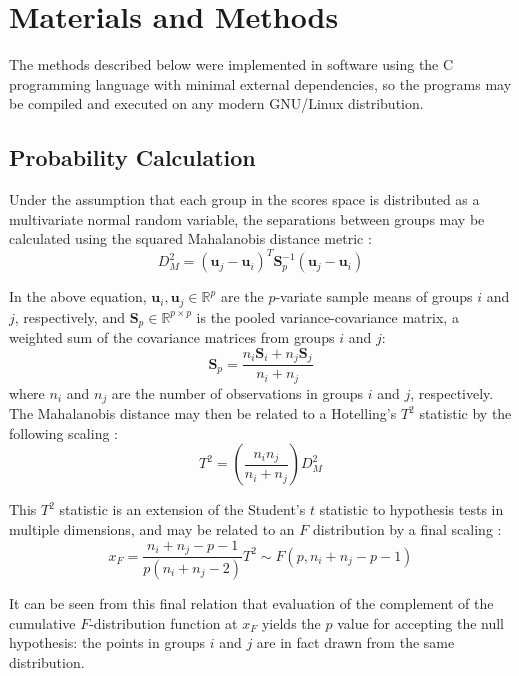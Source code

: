 \section{Materials and Methods}

\begin{doublespace}
The methods described below were implemented in software using the C
programming language with minimal external dependencies, so the programs
may be compiled and executed on any modern GNU/Linux distribution.
\end{doublespace}

\subsection{Probability Calculation}

\begin{doublespace}
Under the assumption that each group in the scores space is distributed as a
multivariate normal random variable, the separations between groups may be
calculated using the squared Mahalanobis distance metric
\cite{mahalanobis:pnisi1936}:
\begin{equation}
D_M^2 =
  (\mathbf{u}_j - \mathbf{u}_i)^T
  \mathbf{S}_p^{-1}
  (\mathbf{u}_j - \mathbf{u}_i)
\end{equation}

In the above equation, $\mathbf{u}_i, \mathbf{u}_j \in \mathbb{R}^p$ are the
$p$-variate sample means of groups $i$ and $j$, respectively, and
$\mathbf{S}_p \in \mathbb{R}^{p \times p}$ is the pooled variance-covariance
matrix, a weighted sum of the covariance matrices from groups $i$ and
$j$:
\begin{equation}
\mathbf{S}_p = \frac{n_i \mathbf{S}_i + n_j \mathbf{S}_j}{n_i + n_j}
\end{equation}
where $n_i$ and $n_j$ are the number of observations in groups $i$ and $j$,
respectively. The Mahalanobis distance may then be related to a Hotelling's
$T^2$ statistic by the following scaling \cite{mardia1979}:
\begin{equation}
T^2 = \left( \frac{n_i n_j}{n_i + n_j} \right) D_M^2
\end{equation}

This $T^2$ statistic is an extension of the Student's $t$ statistic to
hypothesis tests in multiple dimensions, and may be related to an $F$
distribution by a final scaling \cite{mardia1979}:
\begin{equation}
x_F =
  \frac{n_i + n_j - p - 1}{p (n_i + n_j - 2)} T^2 \sim
  F(p, n_i + n_j - p - 1)
\end{equation}

It can be seen from this final relation that evaluation of the complement of
the cumulative $F$-distribution function at $x_F$ yields the $p$ value for
accepting the null hypothesis: the points in groups $i$ and $j$ are in fact
drawn from the same distribution.
\end{doublespace}

